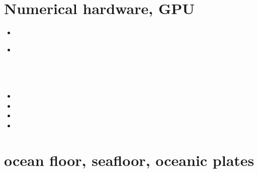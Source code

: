 \section{Numerical hardware, GPU}
\label{sec:topics:hardware}

\begin{small}
\begin{itemize}
\item[\twothousandsix]
\item[\twothousandthirteen]
 \\
 \\
 \\
 \\
\item[\twothousandfourteen]
\item[\twothousandfifteen]
\item[2024] 
\item[2026] 
\end{itemize}
\end{small}

















\section{ocean floor, seafloor, oceanic plates}

